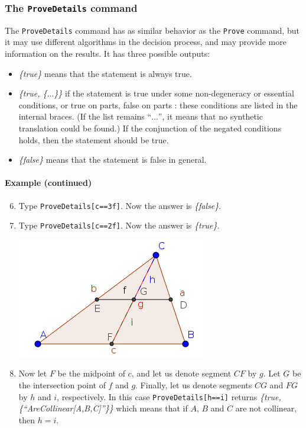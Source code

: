 \documentclass{article}
\begin{document}
\subsubsection{The \texttt{ProveDetails} command}
The \texttt{ProveDetails} command has as similar behavior as the \texttt{Prove} command, but it may use different algorithms in the decision process, and may provide more information on the results. It has three possible outputs:
\begin{itemize}
    \item \textit{\{true\}} means that the statement is always true.
    \item \textit{\{true, \{$\ldots$\}\}} if the statement is true under some non-degeneracy \cite{Chou,RecioVelez} or essential \cite{KovacsRecioSolyomGecse} conditions, or true on parts, false on parts \cite{BotanaRecio2016,KovacsRecioVelez}: these conditions are listed in the internal braces. (If the list remains ``$\ldots$'', it means that no synthetic translation could be found.)  If the conjunction of the negated conditions holds, then the statement should be true.
    \item \textit{\{false\}} means that the statement is false in general.
\end{itemize}
\paragraph{Example (continued)}
\begin{enumerate}
\setcounter{enumi}{5}
    \item Type \texttt{ProveDetails[c==3f]}. Now the answer is \textit{\{false\}}.
    \item Type \texttt{ProveDetails[c==2f]}. Now the answer is \textit{\{true\}}.
\begin{center}
\includegraphics[scale=0.5]{ProveDetails-example-1}
\end{center}
    \item Now let $F$ be the midpoint of $c$, and let us denote segment $CF$ by $g$. Let $G$ be the intersection point of $f$ and $g$. Finally, let us denote segments $CG$ and $FG$ by $h$ and $i$, respectively. In this case \texttt{ProveDetails[h==i]} returns \textit{\{true,\{``AreCollinear[A,B,C]''\}\}} which means that if $A$, $B$ and $C$ are not collinear, then $h=i$.
\end{enumerate}
\end{document}
